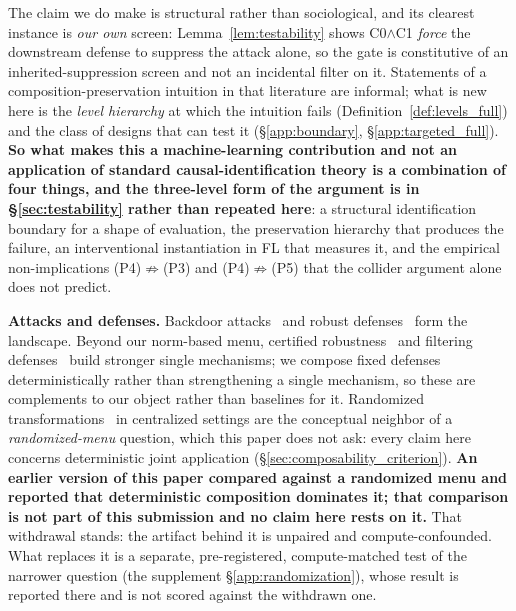 \documentclass{article}
\begin{document}
\noindent The claim we do make is structural rather than sociological, and its clearest instance is \emph{our own} screen: Lemma~\ref{lem:testability} shows C0$\wedge$C1 \emph{force} the downstream defense to suppress the attack alone, so the gate is constitutive of an inherited-suppression screen and not an incidental filter on it. Statements of a composition-preservation intuition in that literature are informal; what is new here is the \emph{level hierarchy} at which the intuition fails (Definition~\ref{def:levels_full}) and the class of designs that can test it (§\ref{app:boundary}, §\ref{app:targeted_full}). \textbf{So what makes this a machine-learning contribution and not an application of standard causal-identification theory is a combination of four things, and the three-level form of the argument is in §\ref{sec:testability} rather than repeated here}: a structural identification boundary for a shape of evaluation, the preservation hierarchy that produces the failure, an interventional instantiation in FL that measures it, and the empirical non-implications (P4)$\not\Rightarrow$(P3) and (P4)$\not\Rightarrow$(P5) that the collider argument alone does not predict.

\textbf{Attacks and defenses.} Backdoor attacks~\citep{chen2017targeted,bagdasaryan2020backdoor,wang2020attack,xie2019dba} and robust defenses~\citep{pillutla2022robust,sun2019can,blanchard2017machine} form the landscape. Beyond our norm-based menu, certified robustness~\citep{xie2021crfl} and filtering defenses~\citep{nguyen2022flame,fung2020foolsgold} build stronger single mechanisms; we compose fixed defenses deterministically rather than strengthening a single mechanism, so these are complements to our object rather than baselines for it. Randomized transformations~\citep{xie2018mitigating,liu2018towards} in centralized settings are the conceptual neighbor of a \emph{randomized-menu} question, which this paper does not ask: every claim here concerns deterministic joint application (§\ref{sec:composability_criterion}). \textbf{An earlier version of this paper compared against a randomized menu and reported that deterministic composition dominates it; that comparison is not part of this submission and no claim here rests on it.} That withdrawal stands: the artifact behind it is unpaired and compute-confounded. What replaces it is a separate, pre-registered, compute-matched test of the narrower question (the supplement §\ref{app:randomization}), whose result is reported there and is not scored against the withdrawn one.
\end{document}
